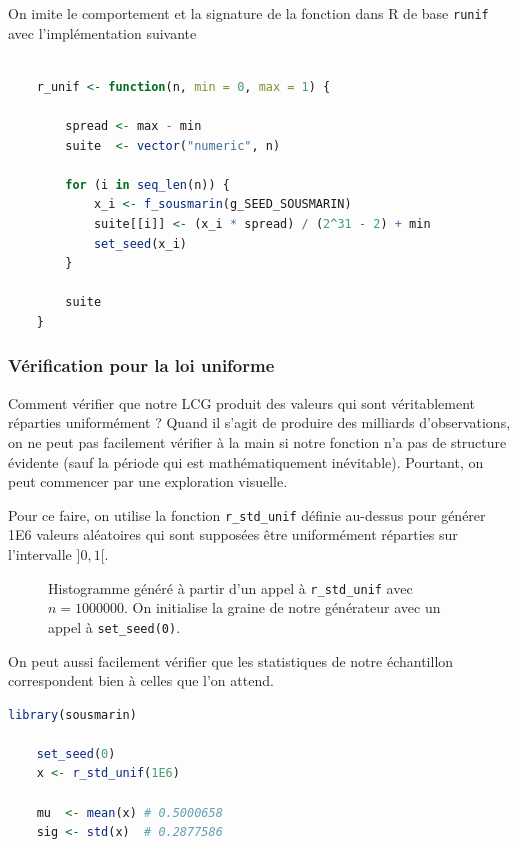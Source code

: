 \documentclass[10pt]{article} %
\begin{document}
On imite le comportement et la signature de la fonction dans R de base \texttt{runif} avec l'implémentation suivante

\begin{lstlisting}[language=R]

    r_unif <- function(n, min = 0, max = 1) {

        spread <- max - min
        suite  <- vector("numeric", n)

        for (i in seq_len(n)) {
            x_i <- f_sousmarin(g_SEED_SOUSMARIN)
            suite[[i]] <- (x_i * spread) / (2^31 - 2) + min
            set_seed(x_i)
        }

        suite
    }

\end{lstlisting}


\subsubsection{Vérification pour la loi uniforme}

Comment vérifier que notre LCG produit des valeurs qui sont véritablement réparties uniformément ? Quand il s'agit de produire
des milliards d'observations, on ne peut pas facilement vérifier à la main si notre fonction n'a pas de structure évidente (sauf la période qui est mathématiquement inévitable).
Pourtant, on peut commencer par une exploration visuelle.

Pour ce faire, on utilise la fonction \texttt{r\_std\_unif} définie au-dessus pour générer 1E6 valeurs aléatoires qui sont supposées être uniformément
réparties sur l'intervalle ]$0, 1$[.

\begin{figure}[h!]
    \centering
    

    \vspace{-1cm}
    \caption{Histogramme généré à partir d'un appel à \texttt{r\_std\_unif} avec $n = 1000000$. On initialise la graine de notre
    générateur avec un appel à \texttt{set\_seed(0)}.}

\end{figure}

On peut aussi facilement vérifier que les statistiques de notre échantillon correspondent bien à celles que l'on attend.

\begin{lstlisting}[language=R]
    library(sousmarin)

    set_seed(0)
    x <- r_std_unif(1E6)

    mu  <- mean(x) # 0.5000658
    sig <- std(x)  # 0.2877586
\end{lstlisting}
\end{document}
